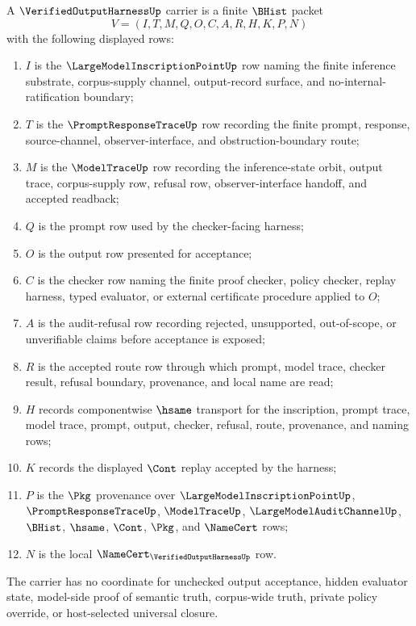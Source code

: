 \begin{definition}
\label{def:verified-output-harness-carrier}
A $\VerifiedOutputHarnessUp$ carrier is a finite $\BHist$ packet
$$
V=(I,T,M,Q,O,C,A,R,H,K,P,N)
$$
with the following displayed rows:
\begin{enumerate}
\item $I$ is the $\LargeModelInscriptionPointUp$ row naming the finite inference substrate, corpus-supply channel, output-record surface, and no-internal-ratification boundary;
\item $T$ is the $\PromptResponseTraceUp$ row recording the finite prompt, response, source-channel, observer-interface, and obstruction-boundary route;
\item $M$ is the $\ModelTraceUp$ row recording the inference-state orbit, output trace, corpus-supply row, refusal row, observer-interface handoff, and accepted readback;
\item $Q$ is the prompt row used by the checker-facing harness;
\item $O$ is the output row presented for acceptance;
\item $C$ is the checker row naming the finite proof checker, policy checker, replay harness, typed evaluator, or external certificate procedure applied to $O$;
\item $A$ is the audit-refusal row recording rejected, unsupported, out-of-scope, or unverifiable claims before acceptance is exposed;
\item $R$ is the accepted route row through which prompt, model trace, checker result, refusal boundary, provenance, and local name are read;
\item $H$ records componentwise $\hsame$ transport for the inscription, prompt trace, model trace, prompt, output, checker, refusal, route, provenance, and naming rows;
\item $K$ records the displayed $\Cont$ replay accepted by the harness;
\item $P$ is the $\Pkg$ provenance over $\LargeModelInscriptionPointUp$, $\PromptResponseTraceUp$, $\ModelTraceUp$, $\LargeModelAuditChannelUp$, $\BHist$, $\hsame$, $\Cont$, $\Pkg$, and $\NameCert$ rows;
\item $N$ is the local $\NameCert_{\VerifiedOutputHarnessUp}$ row.
\end{enumerate}
The carrier has no coordinate for unchecked output acceptance, hidden evaluator state, model-side proof of semantic truth, corpus-wide truth, private policy override, or host-selected universal closure.
\end{definition}

